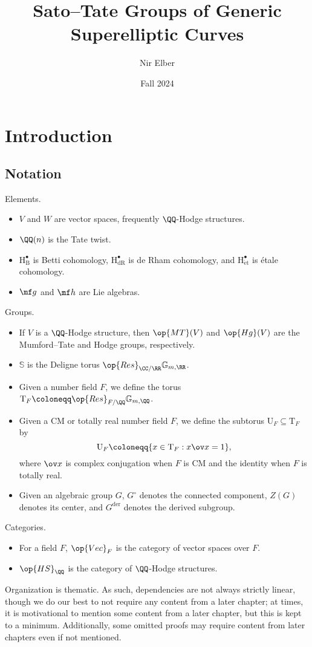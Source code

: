 \documentclass[openany]{book}
\title{Sato--Tate Groups of Generic Superelliptic Curves}
\author{Nir Elber}
\date{Fall 2024}
\begin{document}
\maketitle

\nirtableofcontents

\newpage

\setcounter{chapter}{-1}
\chapter{Introduction}
\section{Notation}
Elements.
\begin{itemize}
	\item $V$ and $W$ are vector spaces, frequently $\QQ$-Hodge structures.
	\item $\QQ(n)$ is the Tate twist.
	\item $\mathrm H_{\mathrm B}^\bullet$ is Betti cohomology, $\mathrm H_{\mathrm{dR}}^\bullet$ is de Rham cohomology, and $\mathrm H_{\mathrm{\acute et}}^\bullet$ is \'etale cohomology.
	\item $\mf g$ and $\mf h$ are Lie algebras.
\end{itemize}
Groups.
\begin{itemize}
	\item If $V$ is a $\QQ$-Hodge structure, then $\op{MT}(V)$ and $\op{Hg}(V)$ are the Mumford--Tate and Hodge groups, respectively.
	\item $\mathbb S$ is the Deligne torus $\op{Res}_{\CC/\RR}\mathbb G_{m,\RR}$.
	\item Given a number field $F$, we define the torus $\mathrm T_F\coloneqq\op{Res}_{F/\QQ}\mathbb G_{m,\QQ}$.
	\item Given a CM or totally real number field $F$, we define the subtorus $\mathrm U_F\subseteq\mathrm T_F$ by
	\[\mathrm U_F\coloneqq\{x\in\mathrm T_F:x\ov x=1\},\]
	where $\ov x$ is complex conjugation when $F$ is CM and the identity when $F$ is totally real.
	\item Given an algebraic group $G$, $G^\circ$ denotes the connected component, $Z(G)$ denotes its center, and $G^{\mathrm{der}}$ denotes the derived subgroup.
\end{itemize}
Categories.
\begin{itemize}
	\item For a field $F$, $\op{Vec}_F$ is the category of vector spaces over $F$.
	\item $\op{HS}_\QQ$ is the category of $\QQ$-Hodge structures.
\end{itemize}
Organization is thematic. As such, dependencies are not always strictly linear, though we do our best to not require any content from a later chapter; at times, it is motivational to mention some content from a later chapter, but this is kept to a minimum. Additionally, some omitted proofs may require content from later chapters even if not mentioned.
\end{document}
